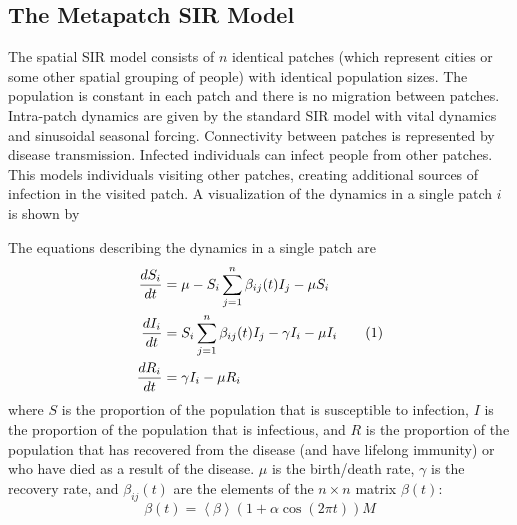 \documentclass[twocolumn,nofootinbib,showkeys,twoside,floatfix,unsortedaddress,flushbottom,10pt,aps,pra]{report}
\newcommand\numberthis{\addtocounter{equation}{1}\tag{\theequation}}
\begin{document}
\subsection{The Metapatch SIR Model} 
\indent
The spatial SIR model consists of $n$ identical patches (which represent cities or some other spatial grouping of people) with identical population sizes. The population is constant in each patch and there is no migration between patches. Intra-patch dynamics are given by the standard SIR model with vital dynamics and sinusoidal seasonal forcing. Connectivity between patches is represented by disease transmission. Infected individuals can infect people from other patches. This models individuals visiting other patches, creating additional sources of infection in the visited patch. 
A visualization of the dynamics in a single patch $i$ is shown by
\begin{center}
\end{center}
\qquad
The equations describing the dynamics in a single patch are
\begin{align*}
  \frac{dS_i}{dt} &= \mu - S_i\sum\limits_{j=1}^{n}\beta_{ij}(t) I_j -\mu S_i \\ 
  \frac{dI_i}{dt} &= S_i\sum\limits_{j=1}^{n}\beta_{ij}(t) I_j -\gamma I_i - \mu I_i  \numberthis \label{model} \\
  \frac{dR_i}{dt} &= \gamma I_i -\mu R_i      
\end{align*}
where $S$ is the proportion of the population that is susceptible to infection, $I$ is the proportion of the population that is infectious, and $R$ is the proportion of the population that has recovered from the disease (and  have lifelong immunity) or who have died as a result of the disease. $\mu$ is the birth/death rate, $\gamma$ is the recovery rate, and $\beta_{ij}(t)$ are the elements of the $n\times n$ matrix $\beta(t)$:
\begin{equation}
  \beta(t) = \left < \beta \right > (1+\alpha \cos(2\pi t))M
\end{equation}
\end{document}
